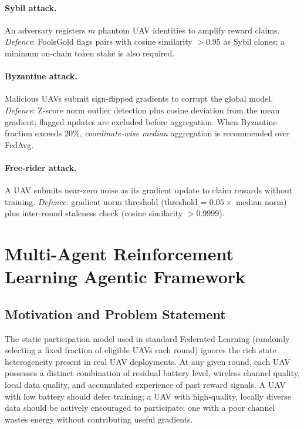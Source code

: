 \documentclass[12pt,a4paper]{article}
\begin{document}
\paragraph{Sybil attack.}
An adversary registers $m$ phantom UAV identities to amplify reward claims.
\emph{Defence}: FoolsGold \cite{fung2018} flags pairs with cosine similarity
$> 0.95$ as Sybil clones; a minimum on-chain token stake is also required.

\paragraph{Byzantine attack.}
Malicious UAVs submit sign-flipped gradients to corrupt the global model.
\emph{Defence}: Z-score norm outlier detection plus cosine deviation from the
mean gradient; flagged updates are excluded before aggregation.  When Byzantine
fraction exceeds 20\%, \emph{coordinate-wise median} \cite{yin2018} aggregation
is recommended over FedAvg.

\paragraph{Free-rider attack.}
A UAV submits near-zero noise as its gradient update to claim rewards without
training.  \emph{Defence}: gradient norm threshold (threshold = $0.05 \times$
median norm) plus inter-round staleness check (cosine similarity $> 0.9999$).

\section{Multi-Agent Reinforcement Learning Agentic Framework}

\subsection{Motivation and Problem Statement}

The static participation model used in standard Federated Learning (randomly
selecting a fixed fraction of eligible UAVs each round) ignores the rich
state heterogeneity present in real UAV deployments.  At any given round, each
UAV possesses a distinct combination of residual battery level, wireless channel
quality, local data quality, and accumulated experience of past reward signals.
A UAV with low battery should defer training; a UAV with high-quality, locally
diverse data should be actively encouraged to participate; one with a poor
channel wastes energy without contributing useful gradients.
\end{document}
